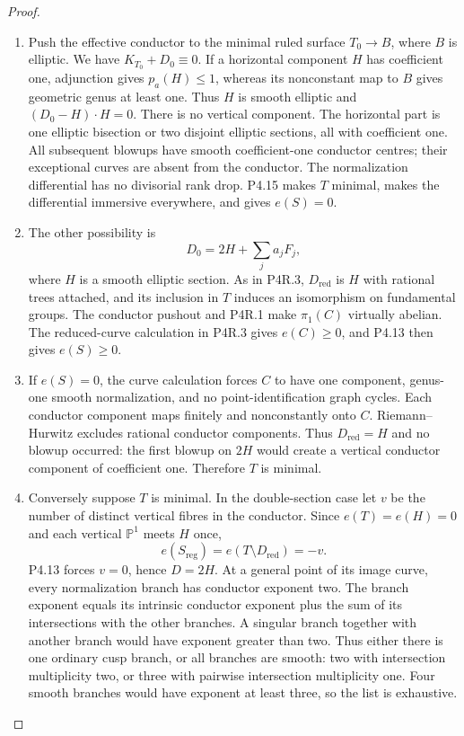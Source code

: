\begin{proof}

\begin{enumerate}[label={$\langle1\rangle$\arabic*.},leftmargin=*]
\item Push the effective conductor to the minimal ruled
surface $T_0\to B$, where $B$ is elliptic. We have
$K_{T_0}+D_0\equiv0$. If a horizontal component $H$
has coefficient one, adjunction gives $p_a(H)\le1$,
whereas its nonconstant map to $B$ gives geometric
genus at least one. Thus $H$ is smooth elliptic and
$(D_0-H)\cdot H=0$. There is no vertical component.
The horizontal part is one elliptic bisection or two
disjoint elliptic sections, all with coefficient one.
All subsequent blowups have smooth coefficient-one
conductor centres; their exceptional curves are absent
from the conductor. The normalization differential
has no divisorial rank drop. P4.15 makes $T$ minimal,
makes the differential immersive everywhere, and
gives $e(S)=0$.

\item The other possibility is
\[
 D_0=2H+\sum_j a_jF_j,
\]
where $H$ is a smooth elliptic section. As in P4R.3,
$D_{\mathrm{red}}$ is $H$ with rational trees attached,
and its inclusion in $T$ induces an isomorphism on
fundamental groups. The conductor pushout and P4R.1
make $\pi_1(C)$ virtually abelian. The reduced-curve
calculation in P4R.3 gives $e(C)\ge0$, and P4.13 then
gives $e(S)\ge0$.

\item If $e(S)=0$, the curve calculation forces $C$ to have
one component, genus-one smooth normalization, and
no point-identification graph cycles. Each conductor
component maps finitely and nonconstantly onto $C$.
Riemann--Hurwitz excludes rational conductor
components. Thus $D_{\mathrm{red}}=H$ and no blowup
occurred: the first blowup on $2H$ would create a
vertical conductor component of coefficient one.
Therefore $T$ is minimal.

\item Conversely suppose $T$ is minimal. In the double-section
case let $v$ be the number of distinct vertical fibres
in the conductor. Since $e(T)=e(H)=0$ and each vertical
$\mathbb P^1$ meets $H$ once,
\[
 e(S_{\mathrm{reg}})=e(T\setminus D_{\mathrm{red}})=-v.
\]
P4.13 forces $v=0$, hence $D=2H$. At a general point
of its image curve, every normalization branch has
conductor exponent two. The branch exponent equals
its intrinsic conductor exponent plus the sum of its
intersections with the other branches. A singular
branch together with another branch would have
exponent greater than two. Thus either there is one
ordinary cusp branch, or all branches are smooth:
two with intersection multiplicity two, or three
with pairwise intersection multiplicity one. Four
smooth branches would have exponent at least three,
so the list is exhaustive.


\end{enumerate}
\end{proof}
